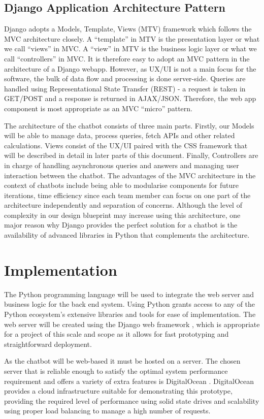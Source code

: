 \documentclass[]{IEEEtran}
\begin{document}
\subsection{Django Application Architecture Pattern}
Django adopts a Models, Template, Views (MTV) framework which follows the MVC architecture closely. A “template” in MTV is the presentation layer or what we call “views” in MVC. A “view” in MTV is the business logic layer or what we call “controllers” in MVC. It is therefore easy to adopt an MVC pattern in the architecture of a Django webapp. However, as UX/UI is not a main focus for the software, the bulk of data flow and processing is done server-side. Queries are handled using Representational State Transfer (REST) - a request is taken in GET/POST and a response is returned in AJAX/JSON. Therefore, the web app component is most appropriate as an MVC “micro” pattern.

The architecture of the chatbot consists of three main parts. Firstly, our Models will be able to manage data, process queries, fetch APIs and other related calculations. Views consist of the UX/UI paired with the CSS framework that will be described in detail in later parts of this document. Finally, Controllers are in charge of handling asynchronous queries and answers and managing user interaction between the chatbot. The advantages of the MVC architecture in the context of chatbots include being able to modularise components for future iterations, time efficiency since each team member can focus on one part of the architecture independently and separation of concerns. Although the level of complexity in our design blueprint may increase using this architecture, one major reason why Django provides the perfect solution for a chatbot is the availability of advanced libraries in Python that complements the architecture.

\section{Implementation}
The Python programming language will be used to integrate the web server and business logic for the back end system. Using Python grants access to any of the Python ecosystem’s extensive libraries and tools \cite{python1} for ease of implementation. The web server will be created using the Django web framework \cite{django}, which is appropriate for a project of this scale and scope as it allows for fast prototyping and straightforward deployment.

As the chatbot will be web-based it must be hosted on a server. The chosen server that is reliable enough to satisfy the optimal system performance requirement and offers a variety of extra features is DigitalOcean \cite{digitalOcean}. DigitalOcean provides a cloud infrastructure suitable for demonstrating this prototype, providing the required level of performance using solid state drives and scalability using proper load balancing to manage a high number of requests. 
\end{document}
